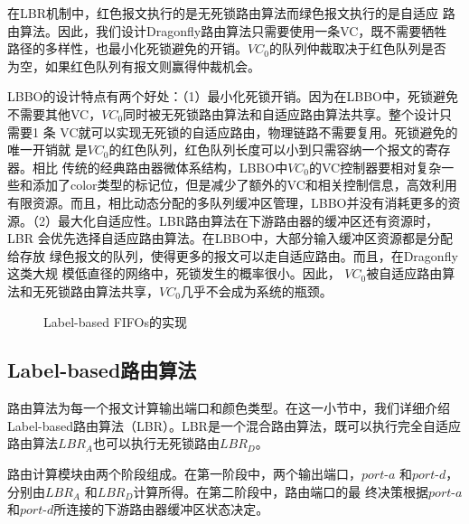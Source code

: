 在LBR机制中，红色报文执行的是无死锁路由算法而绿色报文执行的是自适应
路由算法。因此，我们设计Dragonfly路由算法只需要使用一条VC，既不需要牺牲
路径的多样性，也最小化死锁避免的开销。$VC_0$的队列仲裁取决于红色队列是否
为空，如果红色队列有报文则赢得仲裁机会。

LBBO的设计特点有两个好处：（1）最小化死锁开销。因为在LBBO中，死锁避免不需要其他VC，$VC_0$同时被无死锁路由算法和自适应路由算法共享。整个设计只需要1 条
VC就可以实现无死锁的自适应路由，物理链路不需要复用。死锁避免的唯一开销就
是$VC_0$的红色队列，红色队列长度可以小到只需容纳一个报文的寄存器。相比
传统的经典路由器微体系结构，LBBO中$VC_0$的VC控制器要相对复杂一些和添加了color类型的标记位，但是减少了额外的VC和相关控制信息，高效利用
有限资源。而且，相比动态分配的多队列缓冲区管理，LBBO并没有消耗更多的资源。（2）最大化自适应性。LBR路由算法在下游路由器的缓冲区还有资源时，LBR
会优先选择自适应路由算法。在LBBO中，大部分输入缓冲区资源都是分配给存放
绿色报文的队列，使得更多的报文可以走自适应路由。而且，在Dragonfly这类大规
模低直径的网络中，死锁发生的概率很小。因此，
$VC_0$被自适应路由算法和无死锁路由算法共享，$VC_0$几乎不会成为系统的瓶颈。

\begin{figure}[t]
  \centering
  \caption{Label-based FIFOs的实现}
  \label{fig:grbofifos}
\end{figure}

\subsection{Label-based路由算法}


路由算法为每一个报文计算输出端口和颜色类型。在这一小节中，我们详细介绍
Label-based路由算法（LBR）。LBR是一个混合路由算法，既可以执行完全自适应路由算法$LBR_A$也可以执行无死锁路由$LBR_D$。

路由计算模块由两个阶段组成。在第一阶段中，两个输出端口，$port\textrm{-}a$ 和$port\textrm{-}d$，分别由$LBR_A$ 和$LBR_D$计算所得。在第二阶段中，路由端口的最
终决策根据$port\textrm{-}a$和$port\textrm{-}d$所连接的下游路由器缓冲区状态决定。

